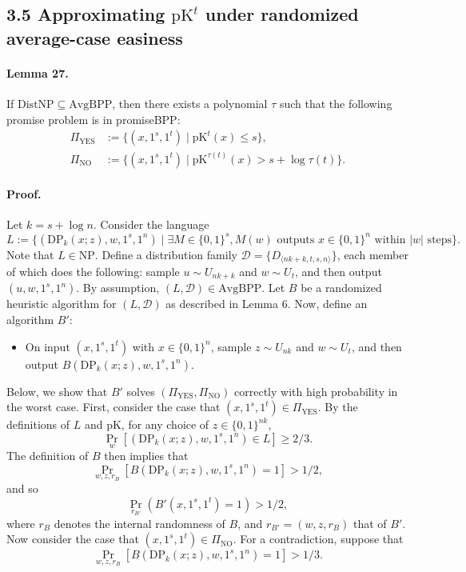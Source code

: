 \documentclass[10pt,a4paper]{article}
\begin{document}
\subsection*{3.5 Approximating $\mathrm{pK}^t$ under randomized average-case easiness}
\paragraph{Lemma 27.} If $\mathrm{DistNP}\subseteq\mathrm{AvgBPP}$, then there exists a polynomial $\tau$ such that the following promise problem is in promiseBPP:
\begin{align*}
\Pi_{\mathrm{YES}}&:=\{(x,1^s,1^t)\mid\mathrm{pK}^t(x)\leq s\},\\
\Pi_{\mathrm{NO}}&:=\{(x,1^s,1^t)\mid\mathrm{pK}^{\tau(t)}(x)>s+\log\tau(t)\}.
\end{align*}
\paragraph{Proof.} Let $k=s+\log n$. Consider the language
\[L:=\{(\mathrm{DP}_k(x;z),w,1^s,1^n)\mid\exists M\in\{0,1\}^s,M(w)\text{ outputs }x\in\{0,1\}^n\text{ within }|w|\text{ steps}\}.\]
Note that $L\in\mathrm{NP}$. Define a distribution family $\mathcal D=\{D_{\langle nk+k,t,s,n\rangle}\}$, each member of which does the following: sample $u\sim U_{nk+k}$ and $w\sim U_t$, and then output $(u,w,1^s,1^n)$. By assumption, $(L,\mathcal D)\in\mathrm{AvgBPP}$. Let $B$ be a randomized heuristic algorithm for $(L,\mathcal D)$ as described in Lemma 6.
Now, define an algorithm $B'$:
\begin{itemize}
\item On input $(x,1^s,1^t)$ with $x\in\{0,1\}^n$, sample $z\sim U_{nk}$ and $w\sim U_t$, and then output $B(\mathrm{DP}_k(x;z),w,1^s,1^n)$.
\end{itemize}
Below, we show that $B'$ solves $(\Pi_{\mathrm{YES}},\Pi_{\mathrm{NO}})$ correctly with high probability in the worst case.
First, consider the case that $(x,1^s,1^t)\in\Pi_{\mathrm{YES}}$. By the definitions of $L$ and pK, for any choice of $z\in\{0,1\}^{nk}$,
\[\Pr_w[(\mathrm{DP}_k(x;z),w,1^s,1^n)\in L]\geq2/3.\]
The definition of $B$ then implies that
\[\Pr_{w,z,r_B}[B(\mathrm{DP}_k(x;z),w,1^s,1^n)=1]>1/2,\]
and so
\[\Pr_{r_{B'}}(B'(x,1^s,1^t)=1)>1/2,\tag{13}\]
where $r_B$ denotes the internal randomness of $B$, and $r_{B'}=(w,z,r_B)$ that of $B'$.
Now consider the case that $(x,1^s,1^t)\in\Pi_{\mathrm{NO}}$. For a contradiction, suppose that
\[\Pr_{w,z,r_B}[B(\mathrm{DP}_k(x;z),w,1^s,1^n)=1]>1/3.\tag{14}\]
\end{document}
